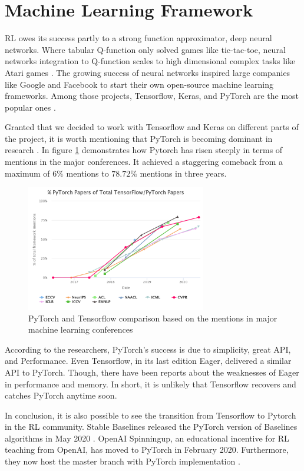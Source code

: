 \section{Machine Learning Framework}


RL owes its success partly to a strong function approximator, deep neural networks. Where tabular Q-function only solved games like tic-tac-toe, neural networks integration to Q-function scales to high dimensional complex tasks like Atari games \cite{Mnih}. The growing success of neural networks inspired large companies like Google and Facebook to start their own open-source machine learning frameworks. Among those projects, Tensorflow, Keras, and PyTorch are the most popular ones \cite{Tensoflow} \cite{Keras} \cite{PyTorch}. 

Granted that we decided to work with Tensorflow and Keras on different parts of the project, it is worth mentioning that PyTorch is becoming dominant in research \cite{Horace}. In figure \ref{fig:ptvstf} demonstrates how Pytorch has risen steeply in terms of mentions in the major conferences. It achieved a staggering comeback from a maximum of \(6\%\) mentions to \(78.72\%\) mentions in three years.  

\begin{figure}[htbp] 
    \centering
    \includegraphics[width=0.7\textwidth]{figures/tfvspytorch}
    \caption{PyTorch and Tensorflow comparison based on the mentions in major machine learning conferences \cite{Horace}}
    \label{fig:ptvstf}
\end{figure}


According to the researchers, PyTorch’s success is due to simplicity, great API, and Performance. Even Tensorflow, in its last edition Eager, delivered a similar API to PyTorch. Though, there have been reports about the weaknesses of Eager in performance and memory. In short, it is unlikely that Tensorflow recovers and catches PyTorch anytime soon.

In conclusion, it is also possible to see the transition from Tensorflow to Pytorch in the RL community. Stable Baselines released the PyTorch version of Baselines algorithms in May 2020 \cite{stable-baselines3}. OpenAI Spinningup, an educational incentive for RL teaching from OpenAI, has moved to PyTorch in February 2020. Furthermore, they now host the master branch with PyTorch implementation \cite{SpinningUp2018}.

 